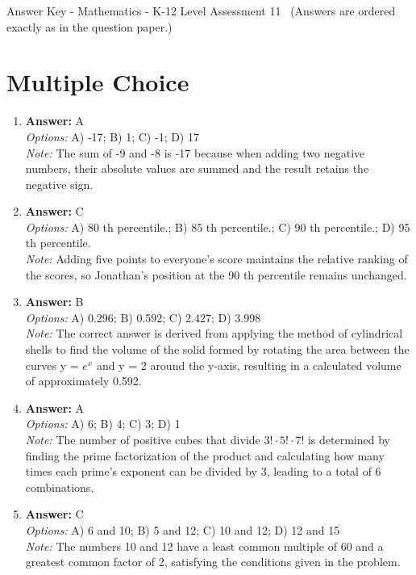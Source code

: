 \documentclass[12pt]{article}
\begin{document}
\begin{center}
Answer Key - Mathematics - K-12 Level Assessment 11 \
\small (Answers are ordered exactly as in the question paper.)
\end{center}

\section*{Multiple Choice}
\begin{enumerate}[label=\arabic*.]
\item \textbf{Answer:} A
\\ \textit{Options:} A) -17; B) 1; C) -1; D) 17
\\ \textit{Note:} The sum of -9 and -8 is -17 because when adding two negative numbers, their absolute values are summed and the result retains the negative sign.
\item \textbf{Answer:} C
\\ \textit{Options:} A) 80 th percentile.; B) 85 th percentile.; C) 90 th percentile.; D) 95 th percentile.
\\ \textit{Note:} Adding five points to everyone's score maintains the relative ranking of the scores, so Jonathan's position at the 90 th percentile remains unchanged.
\item \textbf{Answer:} B
\\ \textit{Options:} A) 0.296; B) 0.592; C) 2.427; D) 3.998
\\ \textit{Note:} The correct answer is derived from applying the method of cylindrical shells to find the volume of the solid formed by rotating the area between the curves y = $e^x$ and y = 2 around the y-axis, resulting in a calculated volume of approximately 0.592.
\item \textbf{Answer:} A
\\ \textit{Options:} A) 6; B) 4; C) 3; D) 1
\\ \textit{Note:} The number of positive cubes that divide \(3! \cdot 5! \cdot 7!\) is determined by finding the prime factorization of the product and calculating how many times each prime's exponent can be divided by 3, leading to a total of 6 combinations.
\item \textbf{Answer:} C
\\ \textit{Options:} A) 6 and 10; B) 5 and 12; C) 10 and 12; D) 12 and 15
\\ \textit{Note:} The numbers 10 and 12 have a least common multiple of 60 and a greatest common factor of 2, satisfying the conditions given in the problem.
\end{enumerate}
\end{document}
